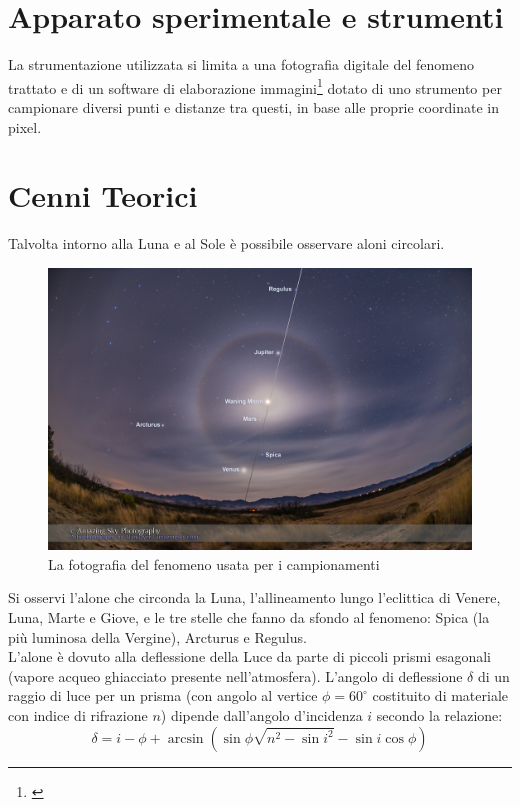 \documentclass{report}[a4paper,11pt]
\begin{document}
\section{Apparato sperimentale e strumenti}
La strumentazione utilizzata si limita a una fotografia digitale del fenomeno trattato e di un software di elaborazione immagini\footnote{\cite{gimp}} dotato di uno strumento per campionare diversi punti e distanze tra questi, in base alle proprie coordinate in pixel.
\section{Cenni Teorici}
Talvolta intorno alla Luna e al Sole \`e possibile osservare aloni circolari.
\begin{figure}[htb!]
  \centering
    \includegraphics[width=\linewidth]{./figs/lunar-halo.jpg}
  \caption{La fotografia del fenomeno usata per i campionamenti}
\end{figure}
Si osservi l'alone che circonda la Luna, l'allineamento lungo l'eclittica di Venere, Luna, Marte e Giove, e le tre stelle che fanno da sfondo al fenomeno: Spica (la pi\`u luminosa della Vergine), Arcturus e Regulus.\\
L'alone \`e dovuto alla deflessione della Luce da parte di piccoli prismi esagonali (vapore acqueo ghiacciato presente nell'atmosfera). 
L'angolo di deflessione $\delta$ di un raggio di luce per un prisma (con angolo al vertice $\phi = 60^\circ$ costituito di materiale con indice di rifrazione $n$) dipende dall'angolo d'incidenza $i$ secondo la relazione:
\begin{equation}\label{eq:delta_ice}
\delta = i - \phi + \arcsin{\left( \sin{\phi} \sqrt{n^2 - \sin{i}^2} - \sin{i} \cos{\phi} \right)}
\end{equation}
\end{document}
